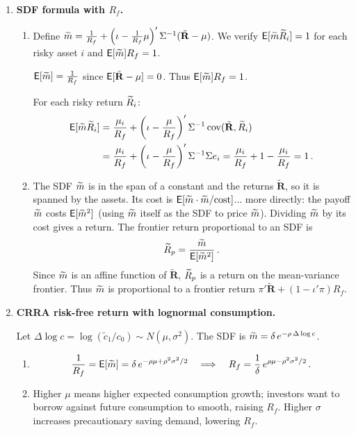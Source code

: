\begin{enumerate}
\item \textbf{SDF formula with $R_f$.}

\begin{enumerate}
\item[(a)] Define $\widetilde{m} = \frac{1}{R_f} + \left(\iota - \frac{1}{R_f}\mu\right)'\Sigma^{-1}(\tilde{\mathbf{R}}-\mu)$.  We verify $\mathsf{E}[\widetilde{m}\widetilde{R}_i]=1$ for each risky asset $i$ and $\mathsf{E}[\widetilde{m}]R_f = 1$.

$\mathsf{E}[\widetilde{m}] = \frac{1}{R_f}$ since $\mathsf{E}[\tilde{\mathbf{R}}-\mu]=0$.  Thus $\mathsf{E}[\widetilde{m}]R_f = 1$.

For each risky return $\widetilde{R}_i$:
\begin{align*}
\mathsf{E}[\widetilde{m} \widetilde{R}_i] &= \frac{\mu_i}{R_f} + \left(\iota - \frac{\mu}{R_f}\right)'\Sigma^{-1}\operatorname{cov}(\tilde{\mathbf{R}},\widetilde{R}_i) \\
&= \frac{\mu_i}{R_f} + \left(\iota - \frac{\mu}{R_f}\right)'\Sigma^{-1}\Sigma e_i = \frac{\mu_i}{R_f} + 1 - \frac{\mu_i}{R_f} = 1\,.
\end{align*}

\item[(b)] The SDF $\widetilde{m}$ is in the span of a constant and the returns $\tilde{\mathbf{R}}$, so it is spanned by the assets.  Its cost is $\mathsf{E}[\widetilde{m}\cdot\widetilde{m}/\text{cost}]$... more directly: the payoff $\widetilde{m}$ costs $\mathsf{E}[\widetilde{m}^2]$ (using $\widetilde{m}$ itself as the SDF to price $\widetilde{m}$).  Dividing $\widetilde{m}$ by its cost gives a return.  The frontier return proportional to an SDF is
\[
\widetilde{R}_p = \frac{\widetilde{m}}{\mathsf{E}[\widetilde{m}^2]}\,.
\]
Since $\widetilde{m}$ is an affine function of $\tilde{\mathbf{R}}$, $\widetilde{R}_p$ is a return on the mean-variance frontier.  Thus $\widetilde{m}$ is proportional to a frontier return $\pi'\tilde{\mathbf{R}} + (1-\iota'\pi)R_f$.
\end{enumerate}

\item \textbf{CRRA risk-free return with lognormal consumption.}

Let $\Delta \log c = \log(\tilde{c}_1/c_0) \sim N(\mu,\sigma^2)$.  The SDF is $\widetilde{m} = \delta\,e^{-\rho\,\Delta\log c}$.

\begin{enumerate}
\item[(a)]
\[
\frac{1}{R_f} = \mathsf{E}[\widetilde{m}] = \delta\,e^{-\rho\mu+\rho^2\sigma^2/2}\quad\Longrightarrow\quad R_f = \frac{1}{\delta}\,e^{\rho\mu - \rho^2\sigma^2/2}\,.
\]

\item[(b)] Higher $\mu$ means higher expected consumption growth; investors want to borrow against future consumption to smooth, raising $R_f$.  Higher $\sigma$ increases precautionary saving demand, lowering $R_f$.
\end{enumerate}


\end{enumerate}
